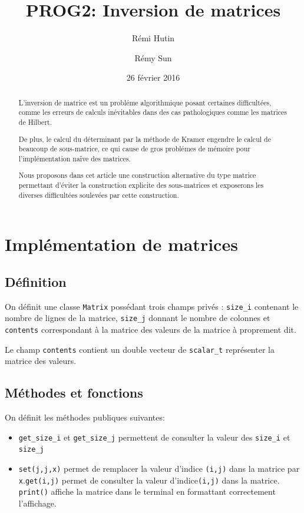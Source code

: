 \documentclass[a4paper,11pt]{article}
\title{PROG2: Inversion de matrices}
\author{Rémi Hutin \and Rémy Sun}
\date{26 février 2016}
\begin{document}
\maketitle

\begin{abstract}
  L'inversion de matrice est un probléme algorithmique posant certaines difficultées, comme les erreurs de calculs inévitables dans des cas pathologiques comme les matrices de Hilbert.

  De plus, le calcul du déterminant par la méthode de Kramer engendre le calcul de beaucoup de sous-matrice, ce qui cause de gros problémes de mémoire pour l'implémentation naïve des matrices.

  Nous proposons dans cet article une construction alternative du type matrice permettant d'éviter la construction explicite des sous-matrices et exposerons les diverses difficultées soulevées par cette construction.
\end{abstract}

\section{Implémentation de matrices}

\subsection{Définition}

On définit une classe \texttt{Matrix} possédant trois champs privés : \texttt{size\_i} contenant le nombre de lignes de la matrice, \texttt{size\_j} donnant le nombre de colonnes et
 \texttt{contents} correspondant à la matrice des valeurs de la matrice à proprement dit.

Le champ  \texttt{contents}  contient un double vecteur de \texttt{scalar\_t} représenter la matrice des valeurs.

\subsection{Méthodes et fonctions}

On définit les méthodes publiques suivantes:

\begin{itemize}
\item \texttt{get\_size\_i} et \texttt{get\_size\_j} permettent de consulter la valeur des \texttt{size\_i} et \texttt{size\_j}
\item \texttt{set(j,j,x)} permet de remplacer la valeur d'indice \texttt{(i,j)} dans la matrice par \texttt{x}.\texttt{get(i,j)} permet de consulter la valeur d'indice\texttt{(i,j)} dans la matrice. \texttt{print()} affiche la matrice dans le terminal en formattant correctement l'affichage.
\end{itemize}
\end{document}
